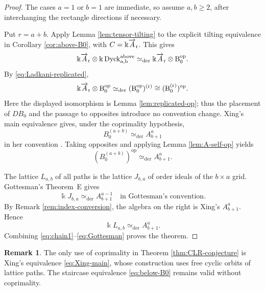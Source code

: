 \documentclass[12pt,a4paper,english,reqno]{amsart}
\theoremstyle{plain}
\theoremstyle{definition}
\newtheorem{remark}[theorem]{Remark}
\newcommand{\kk}{\Bbbk}
\newcommand{\Dyck}{\operatorname{Dyck}}
\newcommand{\op}{\mathrm{op}}
\newcommand{\ovr}{\rm \overrightarrow}
\begin{document}
\begin{proof}
The cases $a=1$ or $b=1$ are immediate, so assume $a,b\geq2$, after
interchanging the rectangle directions if necessary.

Put $r=a+b$.  Apply Lemma \ref{lem:tensor-tilting} to the explicit tilting
equivalence in Corollary \ref{cor:above-B0}, with $C=\kk\ovr A_r$.  This gives
\begin{equation}
 \kk\ovr A_r\otimes
 \kk\Dyck^{\mathrm{above}}_{a,b}
 \simeq_{\mathrm{der}}
 \kk\ovr A_r\otimes B_0^{\op}.
\label{eq:chain1}
\end{equation}
By \eqref{eq:Ladkani-replicated},
\begin{equation}
 \kk\ovr A_r\otimes B_0^{\op}
 \simeq_{\mathrm{der}}
 (B_0^{\op})^{(r)}
 \cong(B_0^{(r)})^{\op}.
\label{eq:chain2}
\end{equation}
Here the displayed isomorphism is Lemma \ref{lem:replicated-op}; thus the
placement of $D B_0$ and the passage to opposites introduce no convention
change.
Xing's main equivalence gives, under the coprimality hypothesis,
\begin{equation}
 B_0^{(a+b)}\simeq_{\mathrm{der}}A_{b+1}^{a}
\label{eq:Xing-main}
\end{equation}
in her convention \cite[Theorem~4.5 and Proposition~4.25]{Xing}.  Taking
opposites and applying Lemma \ref{lem:A-self-op} yields
\begin{equation}
 (B_0^{(a+b)})^{\op}
 \simeq_{\mathrm{der}}A_{b+1}^{a}.
\label{eq:chain3}
\end{equation}

The lattice $L_{a,b}$ of all paths is the lattice
$J_{b,a}$ of order ideals of the $b\times a$ grid.  Gottesman's
Theorem~E gives
\[
 \kk J_{b,a}
 \simeq_{\mathrm{der}} A_{b+1}^{a-1}
 \quad\text{in Gottesman's convention}.
\]
By Remark \ref{rem:index-conversion}, the algebra on the right is Xing's
$A_{b+1}^{a}$.  Hence
\begin{equation}
 \kk L_{a,b}\simeq_{\mathrm{der}}A_{b+1}^{a}.
\label{eq:Gottesman}
\end{equation}
Combining \eqref{eq:chain1}--\eqref{eq:Gottesman} proves the theorem.
\end{proof}

\begin{remark}
The only use of coprimality in Theorem \ref{thm:CLR-conjecture} is Xing's
equivalence \eqref{eq:Xing-main}, whose construction uses free cyclic orbits
of lattice paths.  The staircase equivalence
\eqref{eq:below-B0} remains valid without coprimality.
\end{remark}
\end{document}
